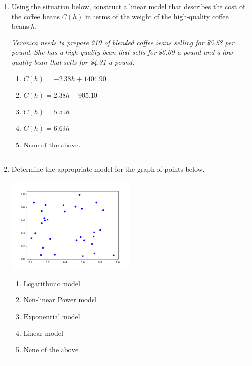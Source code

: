\documentclass[14pt]{extbook}
\newcommand{\litem}[1]{\item#1\hspace*{-1cm}\rule{\textwidth}{0.4pt}}
\begin{document}
\begin{enumerate}
\litem{
Using the situation below, construct a linear model that describes the cost of the coffee beans $C(h)$ in terms of the weight of the high-quality coffee beans $h$.
\begin{center}
    \textit{ Veronica needs to prepare 210 of blended coffee beans selling for \$5.58 per pound. She has a high-quality bean that sells for \$6.69 a pound and a low-quality bean that sells for \$4.31 a pound. }
\end{center}
\begin{enumerate}[label=\Alph*.]
\item \( C(h) = -2.38 h + 1404.90 \)
\item \( C(h) = 2.38 h + 905.10 \)
\item \( C(h) = 5.50 h \)
\item \( C(h) = 6.69 h \)
\item \( \text{None of the above.} \)

\end{enumerate} }
\litem{
Determine the appropriate model for the graph of points below.
\begin{center}
    \includegraphics[width=0.5\textwidth]{../Figures/identifyModelGraph12CopyA.png}
\end{center}
\begin{enumerate}[label=\Alph*.]
\item \( \text{Logarithmic model} \)
\item \( \text{Non-linear Power model} \)
\item \( \text{Exponential model} \)
\item \( \text{Linear model} \)
\item \( \text{None of the above} \)


\end{enumerate}}
\end{enumerate}
\end{document}
